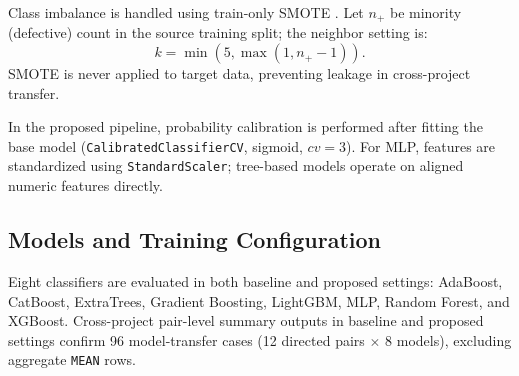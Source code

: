 \documentclass[conference]{IEEEtran}
\begin{document}
Class imbalance is handled using train-only SMOTE \cite{r9}. Let \(n_{+}\) be minority (defective) count in the source training split; the neighbor setting is:
\begin{equation}
k=\min(5,\max(1,n_{+}-1)).
\end{equation}
SMOTE is never applied to target data, preventing leakage in cross-project transfer.

In the proposed pipeline, probability calibration is performed after fitting the base model (\texttt{CalibratedClassifierCV}, sigmoid, \(cv=3\)). For MLP, features are standardized using \texttt{StandardScaler}; tree-based models operate on aligned numeric features directly.

\subsection{Models and Training Configuration}
Eight classifiers are evaluated in both baseline and proposed settings: AdaBoost, CatBoost, ExtraTrees, Gradient Boosting, LightGBM, MLP, Random Forest, and XGBoost. Cross-project pair-level summary outputs in baseline and proposed settings confirm 96 model-transfer cases (12 directed pairs \(\times\) 8 models), excluding aggregate \texttt{MEAN} rows.
\end{document}
